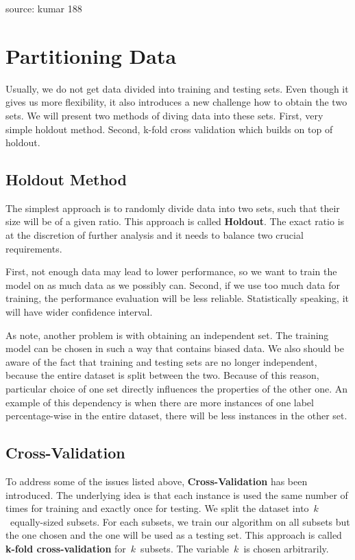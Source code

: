 {source: kumar 188}


\section{Partitioning Data}

Usually, we do not get data divided into training and testing sets.
Even though it gives us more flexibility, it also introduces a new challenge how to obtain the two sets.
We will present two methods of diving data into these sets.
First, very simple holdout method.
Second, k-fold cross validation which builds on top of holdout.

\subsection{Holdout Method}

The simplest approach is to randomly divide data into two sets, such that their size will be of a given ratio.
This approach is called {\bf Holdout}.
The exact ratio is at the discretion of further analysis and it needs to balance two crucial requirements.

First, not enough data may lead to lower performance, so we want to train the model on as much data as we possibly can.
Second, if we use too much data for training, the performance evaluation will be less reliable.
Statistically speaking, it will have wider confidence interval.

As \citet{TanBachKum08} note, another problem is with obtaining an independent set.
The training model can be chosen in such a way that contains biased data.
We also should be aware of the fact that training and testing sets are no longer independent,
because the entire dataset is split between the two.
Because of this reason, particular choice of one set directly influences the properties of the other one.
An example of this dependency is when there are more instances of one label percentage-wise in the entire dataset,
there will be less instances in the other set.


\subsection{Cross-Validation}

To address some of the issues listed above, {\bf Cross-Validation} has been introduced.
The underlying idea is that each instance is used the same number of times for training and exactly once for testing.
We split the dataset into~$k$~equally-sized subsets.
For each subsets, we train our algorithm on all subsets but the one chosen and the one will be used as a testing set.
This approach is called {\bf k-fold cross-validation} for~$k$~subsets. The variable~$k$~is chosen arbitrarily.


